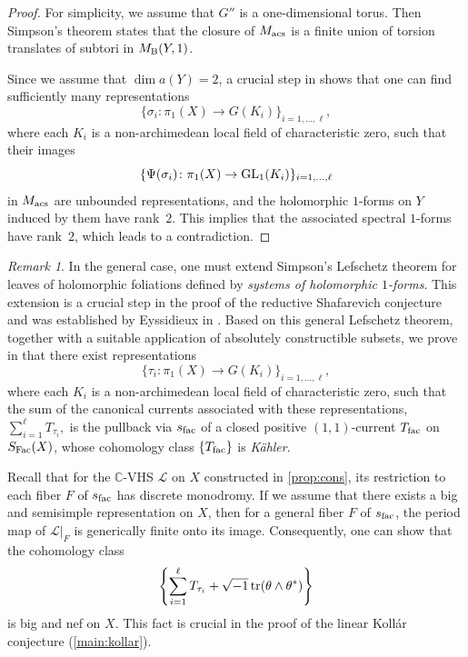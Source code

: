 \documentclass[english]{amsproc}
\theoremstyle{plain}
\theoremstyle{definition}
\theoremstyle{remark}
\newtheorem{rem}[thm]{Remark}
\theoremstyle{plain}
\numberwithin{equation}{thm} %
\newcommand{\cL}{\mathcal L}
\newcommand{\bC}{\mathbb{C}}
\def\sn{\sqrt{-1}}
\newcommand{\GL}{{\rm GL}}
\begin{document}
\begin{proof}
		For simplicity, we assume that $G''$ is a one-dimensional torus. Then Simpson's theorem \cite{Sim93b} states that the closure of $M_{\rm acs}$ is a finite union of torsion translates of subtori in $M_{\rm B}(Y,1)$. 
		
	Since we assume that $\dim a(Y)=2$, a crucial step in \cite[Theorem~4.5]{DY23} shows that one can find sufficiently many representations
	\[
	\{\sigma_i \colon \pi_1(X) \to G(K_i)\}_{i=1,\ldots,\ell},
	\]
	where each $K_i$ is a non-archimedean local field of characteristic zero, such that their images
	\[
	\{\Psi(\sigma_i) \colon \pi_1(X) \to \GL_1(K_i)\}_{i=1,\ldots,\ell}
	\]
	in $M_{\rm acs}$ are unbounded representations, and the holomorphic $1$-forms on $Y$ induced by them have rank~$2$.
	This implies that the associated spectral $1$-forms have rank~$2$, which leads to a contradiction. 
	\end{proof}
	\begin{rem}\label{rem:byproduct}
		In the general case, one must extend Simpson’s Lefschetz theorem for leaves of holomorphic foliations defined by \emph{systems of holomorphic $1$-forms}. 
		This extension is a crucial step in the proof of the reductive Shafarevich conjecture and was established by Eyssidieux in \cite{Eys04}. 
		Based on this general Lefschetz theorem, together with a suitable application of absolutely constructible subsets, we prove in \cite[Proof of Theorem~4.31]{DY23} that there exist representations
		\[
		\{\tau_i \colon \pi_1(X) \to G(K_i)\}_{i=1,\ldots,\ell},
		\]
		where each $K_i$ is a non-archimedean local field of characteristic zero, such that the sum of the canonical currents associated with these representations,
$
		\sum_{i=1}^{\ell} T_{\tau_i},
$
		is the pullback via $s_{\rm fac}$ of a closed positive $(1,1)$-current $T_{\rm fac}$ on $S_{\rm Fac}(X)$, whose cohomology class $\{T_{\rm fac}\}$ is \emph{K\"ahler}.
		
		Recall that for the $\bC$-VHS $\cL$ on $X$ constructed in \cref{prop:cons}, its restriction to each fiber $F$ of $s_{\rm fac}$ has discrete monodromy. 
		If we assume that there exists a big and semisimple representation on $X$, then for a general fiber $F$ of $s_{\rm fac}$, the period map of $\cL|_{F}$ is generically finite onto its image. 
		Consequently, one can show that the cohomology class
		\[
		\left\{ \sum_{i=1}^{\ell} T_{\tau_i} + \sn\,{\rm tr}(\theta \wedge \theta^*) \right\}
		\]
		is big and nef on $X$. 
		This fact is crucial in the proof of the linear Koll\'ar conjecture (\cref{main:kollar}). 
	\end{rem}
\end{document}
